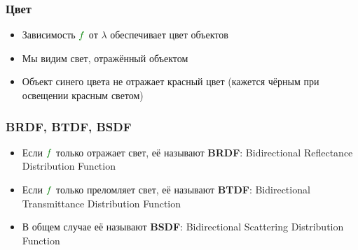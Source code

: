 \documentclass[10pt]{beamer}
\begin{document}
\begin{frame}[fragile]
\frametitle{Цвет}
\begin{itemize}
\item Зависимость \begin{math}{\color{green}f}\end{math} от \begin{math}\lambda\end{math} обеспечивает цвет объектов
\pause
\item Мы видим свет, отражённый объектом
\pause
\item Объект синего цвета не отражает красный цвет (кажется чёрным при освещении красным светом)
\end{itemize}
\end{frame}

\begin{frame}[fragile]
\frametitle{BRDF, BTDF, BSDF}
\begin{itemize}
\item Если \begin{math}{\color{green}f}\end{math} только отражает свет, её называют \textbf{BRDF}: Bidirectional Reflectance Distribution Function
\pause 
\item Если \begin{math}{\color{green}f}\end{math} только преломляет свет, её называют \textbf{BTDF}: Bidirectional Transmittance Distribution Function
\pause 
\item В общем случае её называют \textbf{BSDF}: Bidirectional Scattering Distribution Function
\end{itemize}
\end{frame}
\end{document}
